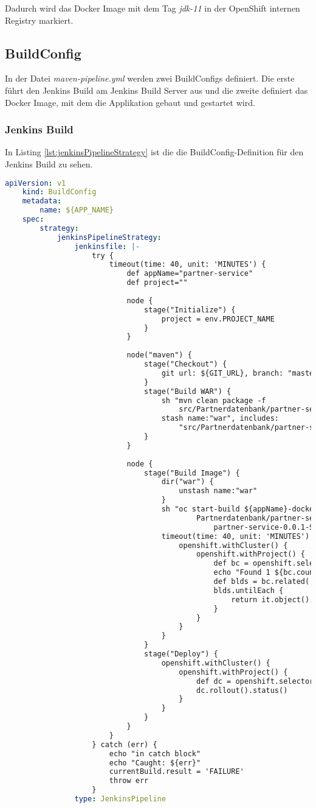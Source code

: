 Dadurch wird das Docker Image mit dem Tag \textit{jdk-11} in der OpenShift internen Registry markiert.

\subsection{BuildConfig}
In der Datei \textit{maven-pipeline.yml} werden zwei BuildConfigs definiert. Die erste führt den Jenkins Build am Jenkins Build Server aus und die zweite definiert das Docker Image, mit dem die Applikation gebaut und gestartet wird.

\subsubsection{Jenkins Build}
In Listing \ref{lst:jenkinsPipelineStrategy} ist die die BuildConfig-Definition für den Jenkins Build zu sehen.

\begin{lstlisting}[language=yml, caption=maven-pipeline.yml - Jenkins BuildConfig, label=lst:jenkinsPipelineStrategy]
	apiVersion: v1
	kind: BuildConfig
	metadata:
		name: ${APP_NAME}
	spec:
		strategy:
			jenkinsPipelineStrategy:
				jenkinsfile: |-
					try {
						timeout(time: 40, unit: 'MINUTES') {
							def appName="partner-service"
							def project=""
							
							node {
								stage("Initialize") {
									project = env.PROJECT_NAME
								}
							}
							
							node("maven") {
								stage("Checkout") {
									git url: ${GIT_URL}, branch: "master"
								}
								stage("Build WAR") {
									sh "mvn clean package -f
										src/Partnerdatenbank/partner-service/pom.xml"
									stash name:"war", includes:
										"src/Partnerdatenbank/partner-service/target/*"
								}
							}
							
							node {
								stage("Build Image") {
									dir("war") {
										unstash name:"war"
									}
									sh "oc start-build ${appName}-docker --from-file=war/src/
											Partnerdatenbank/partner-service/target/
												partner-service-0.0.1-SNAPSHOT.jar -n ${project}"
									timeout(time: 40, unit: 'MINUTES') {
										openshift.withCluster() {
											openshift.withProject() {
												def bc = openshift.selector('bc', "${appName}-docker")
												echo "Found 1 ${bc.count()} buildconfig"
												def blds = bc.related('builds')
												blds.untilEach {
													return it.object().status.phase == "Complete"
												}
											}
										}  
									}
								}
								stage("Deploy") {
									openshift.withCluster() {
										openshift.withProject() {
											def dc = openshift.selector('dc', "${appName}")
											dc.rollout().status()
										}
									}
								}
							}
						}
					} catch (err) {
						echo "in catch block"
						echo "Caught: ${err}"
						currentBuild.result = 'FAILURE'
						throw err
					}
				type: JenkinsPipeline
\end{lstlisting}

